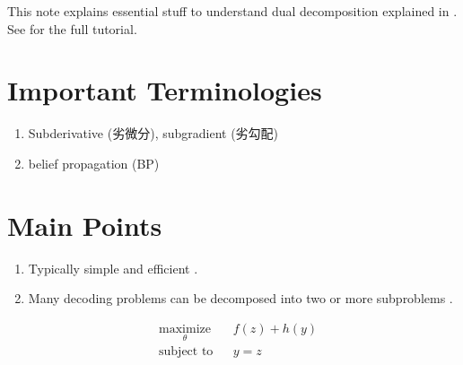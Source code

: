 \documentclass[11pt]{article}
\begin{document}
This note explains essential stuff to understand dual decomposition explained in \cite{pfi_dual_decomposition}. 
See \cite{Rush_2012_tutorial} for the full tutorial.

\section{Important Terminologies}
\begin{enumerate}
 \item Subderivative (劣微分), subgradient (劣勾配)
 \item belief propagation (BP)
\end{enumerate}

\section{Main Points}
\begin{enumerate}
 \item Typically simple and efficient \cite{Rush_2012_tutorial}.
 \item Many decoding problems can be decomposed into two or more subproblems \cite{Rush_2012_tutorial}.
\end{enumerate}

\begin{equation*}
\begin{aligned}
& \underset{\theta}{\text{maximize}}
& & f(z) + h(y) \\
& \text{subject to}
& & y = z \\
\end{aligned}
\end{equation*}



\end{document}

